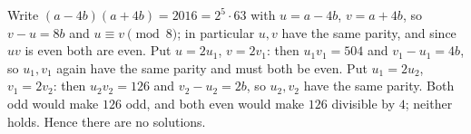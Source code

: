 Write $(a-4b)(a+4b)=2016=2^5\cdot63$ with $u=a-4b$, $v=a+4b$, so $v-u=8b$ and $u\equiv v\pmod 8$; in particular $u,v$ have the same parity, and since $uv$ is even both are even. Put $u=2u_1$, $v=2v_1$: then $u_1v_1=504$ and $v_1-u_1=4b$, so $u_1,v_1$ again have the same parity and must both be even. Put $u_1=2u_2$, $v_1=2v_2$: then $u_2v_2=126$ and $v_2-u_2=2b$, so $u_2,v_2$ have the same parity. Both odd would make $126$ odd, and both even would make $126$ divisible by $4$; neither holds. Hence there are no solutions.
